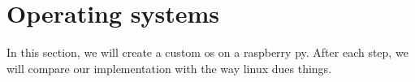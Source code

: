 \section{Operating systems}

In this section, we will create a custom os on a raspberry py. After each step, we will compare our implementation with the way linux dues things. 

